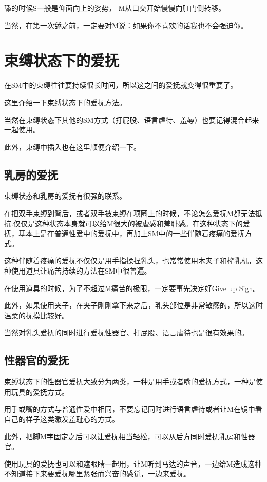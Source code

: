 \documentclass[12pt,UTF8]{ctexbook}
\begin{document}
舔的时候S一般是仰面向上的姿势， M从口交开始慢慢向肛门侧转移。

当然，在第一次舔之前，一定要对M说：如果你不喜欢的话我也不会强迫你。

\section{束缚状态下的爱抚}

在SM中的束缚往往要持续很长时间，所以这之间的爱抚就变得很重要了。

这里介绍一下束缚状态下的爱抚方法。

当然在束缚状态下其他的SM方式（打屁股、语言虐待、羞辱）也要记得混合起来一起使用。

此外，束缚中插入也在这里顺便介绍一下。 

\subsection{乳房的爱抚}

束缚状态和乳房的爱抚有很强的联系。

在把双手束缚到背后，或者双手被束缚在项圈上的时候，不论怎么爱抚M都无法抵抗.仅仅是这种状态本身就可以给M很大的被虐感和羞耻感。在这种状态下的爱抚，基本上是在普通性爱中的爱抚中，再加上SM中的一些伴随着疼痛的爱抚方式。

这种伴随着疼痛的爱抚不仅仅是用手指揉捏乳头，也常常使用木夹子和榨乳机，这种使用道具让痛苦持续的方法在SM中很普遍。

在使用道具的时候，为了不超过M痛苦的极限，一定要事先决定好Give up Sign。

此外，如果使用夹子，在夹子刚刚拿下来之后，乳头部位是非常敏感的，所以这时温柔的抚摸比较好。

当然对乳头爱抚的同时进行爱抚性器官、打屁股、语言虐待也是很有效果的。 

\subsection{性器官的爱抚}

束缚状态下的性器官爱抚大致分为两类，一种是用手或者嘴的爱抚方式，一种是使用玩具的爱抚方式。

用手或嘴的方式与普通性爱中相同，不要忘记同时进行语言虐待或者让M在镜中看自己的样子这类激发羞耻心的方式。

此外，把脚M字固定之后可以让爱抚相当轻松，可以从后方同时爱抚乳房和性器官。

使用玩具的爱抚也可以和遮眼睛一起用，让M听到马达的声音，一边给M造成这种不知道接下来要爱抚哪里紧张而兴奋的感觉，一边来爱抚。
\end{document}
